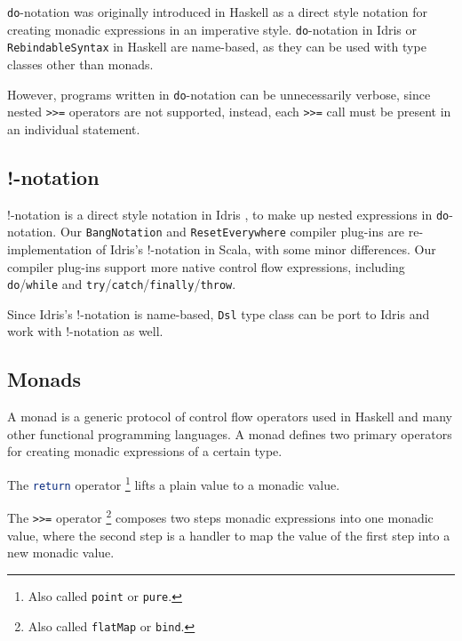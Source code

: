 \lstinline{do}-notation was originally introduced in Haskell \cite{jones1998haskell} as a direct style notation for creating monadic expressions in an imperative style. \lstinline{do}-notation in Idris or \lstinline{RebindableSyntax} in Haskell are name-based, as they can be used with type classes other than monads.

However, programs written in \lstinline{do}-notation can be unnecessarily verbose, since nested \lstinline{>>=} operators are not supported, instead, each \lstinline{>>=} call must be present in an individual statement. 

\subsection{!-notation}

!-notation is a direct style notation in Idris \cite{brady2013idris}, to make up nested expressions in \lstinline{do}-notation. Our \lstinline{BangNotation} and \lstinline{ResetEverywhere} compiler plug-ins are re-implementation of Idris's !-notation in Scala, with some minor differences. Our compiler plug-ins support more native control flow expressions, including \lstinline{do}/\lstinline{while} and \lstinline{try}/\lstinline{catch}/\lstinline{finally}/\lstinline{throw}.

Since Idris's !-notation is name-based, \lstinline{Dsl} type class can be port to Idris and work with !-notation as well.

\subsection{Monads}\label{Monads}

A monad is a generic protocol of control flow operators used in Haskell and many other functional programming languages. A monad defines two primary operators for creating monadic expressions of a certain type.
\begin{enumerate*}
  \item The \lstinline[language=Haskell,deletekeywords={return}]{return} operator \footnote{Also called \lstinline{point} or \lstinline{pure}.} lifts a plain value to a monadic value.
  \item The \lstinline{>>=} operator \footnote{Also called \lstinline{flatMap} or \lstinline{bind}.} composes two steps monadic expressions into one monadic value, where the second step is a handler to map the value of the first step into a new monadic value.
\end{enumerate*}

